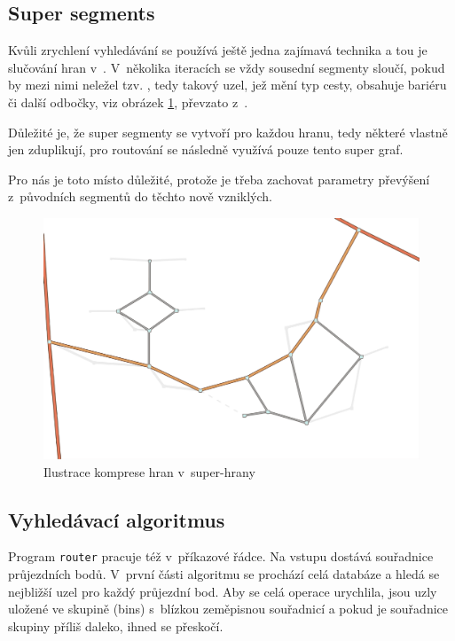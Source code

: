 \documentclass[thesis=B,czech]{FITthesis}[2012/06/26]
\begin{document}
\subsection{Super segments}
\label{super-segments}
Kvůli zrychlení vyhledávání se používá ještě jedna zajímavá technika a tou je slučování hran v~. V~několika iteracích se vždy sousední segmenty sloučí, pokud by mezi nimi neležel tzv. , tedy takový uzel, jež mění typ cesty, obsahuje bariéru či další odbočky, viz obrázek \ref{img:superhrany}, převzato z~\cite{routino-doc}.

Důležité je, že super segmenty se vytvoří pro každou hranu, tedy některé vlastně jen zduplikují, pro routování se následně využívá pouze tento super graf.

Pro nás je toto místo důležité, protože je třeba zachovat parametry převýšení z~původních segmentů do těchto nově vzniklých.

\begin{figure}[!ht]
\centering
\includegraphics[width=\columnwidth]{obrazky/supernodes.pdf}
\caption{Ilustrace komprese hran v~super-hrany }
\label{img:superhrany}
\end{figure}



\subsection{Vyhledávací algoritmus}
\label{vyhledavaci-algoritmus}
Program \verb|router| pracuje též v~příkazové řádce. Na vstupu dostává souřadnice průjezdních bodů. V~první části algoritmu se prochází celá databáze a hledá se nejbližší uzel pro každý průjezdní bod. Aby se celá operace urychlila, jsou uzly uložené ve skupině (bins) s~blízkou zeměpisnou souřadnicí a pokud je souřadnice skupiny příliš daleko, ihned se přeskočí.
\end{document}
